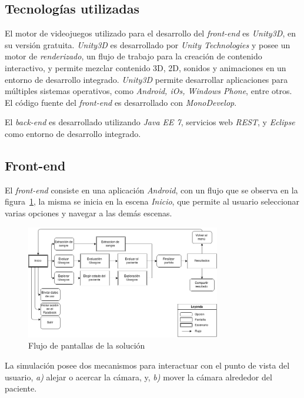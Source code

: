 \subsection{Tecnologías utilizadas}

El motor de videojuegos utilizado para el desarrollo del \textit{front-end} es
\textit{Unity3D}, en su versión gratuita. \textit{Unity3D} es desarrollado por
\textit{Unity Technologies} y posee un motor de \textit{renderizado}, un flujo
de trabajo para la creación de contenido interactivo, y permite mezclar
contenido 3D, 2D, sonidos y animaciones en un entorno de desarrollo integrado.
\textit{Unity3D} permite desarrollar aplicaciones para múltiples sistemas
operativos, como \textit{Android, iOs, Windows Phone}, entre
otros\cite{unity3d}. El código fuente del \textit{front-end} es desarrollado con
\textit{MonoDevelop}.

El \textit{back-end} es desarrollado utilizando \textit{Java EE 7}, servicios web
\textit{REST}, y \textit{Eclipse} como entorno de desarrollo integrado. 

\subsection{Front-end}

El \textit{front-end} consiste en una aplicación \textit{Android}, con un flujo que se observa en la
figura~\ref{fig:flujo_frontend}, la misma se inicia en la escena \emph{Inicio},
que permite al usuario seleccionar varias opciones y navegar a las demás
escenas.

\begin{figure}
\centering
\includegraphics[width=8.5cm]{../solucion/images/grafo_escenas.png}
\caption{Flujo de pantallas de la solución}
\label{fig:flujo_frontend}
\end{figure}

La simulación posee dos mecanismos para interactuar con el punto de vista del
usuario, \textit{a)} alejar o acercar la cámara, y, \textit{b)} mover la cámara
alrededor del paciente.

